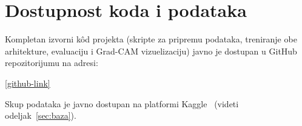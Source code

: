 \documentclass[12pt,a4paper]{article}
\begin{document}
\section{Dostupnost koda i podataka}
\label{sec:dostupnost}

Kompletan izvorni kôd projekta (skripte za pripremu podataka, treniranje obe
arhitekture, evaluaciju i Grad-CAM vizuelizaciju) javno je dostupan u GitHub
repozitorijumu na adresi:
\begin{center}
\url{[github-link]}
\end{center}
Skup podataka je javno dostupan na platformi Kaggle~\cite{khan2023dataset}
(videti odeljak~\ref{sec:baza}).

\newpage


\end{document}
